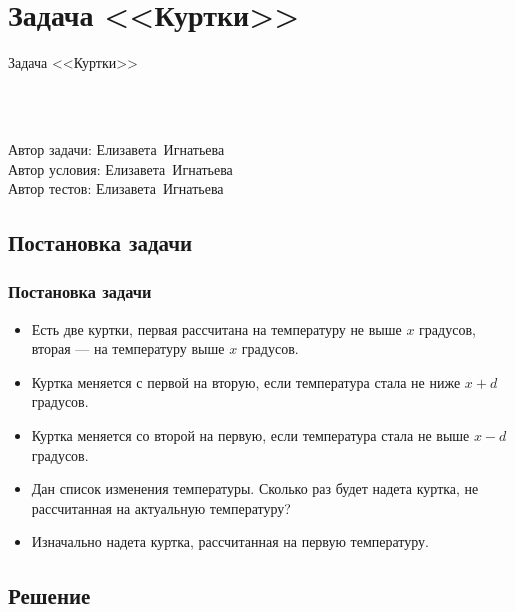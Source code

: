 \section{Задача <<Куртки>>}


\begin{frame}
    \begin{center}
        \Huge Задача <<Куртки>>
    \end{center}
    ~\\~\\
    \begin{center}
        Автор задачи: Елизавета~Игнатьева\\
        Автор условия: Елизавета~Игнатьева\\
        Автор тестов: Елизавета~Игнатьева
    \end{center}
\end{frame}

\subsection{Постановка задачи}

\begin{frame}
    \frametitle{Постановка задачи}

    \begin{itemize}
        \item Есть две куртки, первая рассчитана на температуру не выше $x$ градусов, вторая --- на температуру выше $x$ градусов.
        \item Куртка меняется с первой на вторую, если температура стала не ниже $x+d$ градусов.
        \item Куртка меняется со второй на первую, если температура стала не выше $x-d$ градусов.
        \item Дан список изменения температуры. Сколько раз будет надета куртка, не рассчитанная на актуальную температуру?
        \item Изначально надета куртка, рассчитанная на первую температуру.
    \end{itemize}
\end{frame}

\subsection{Решение}

